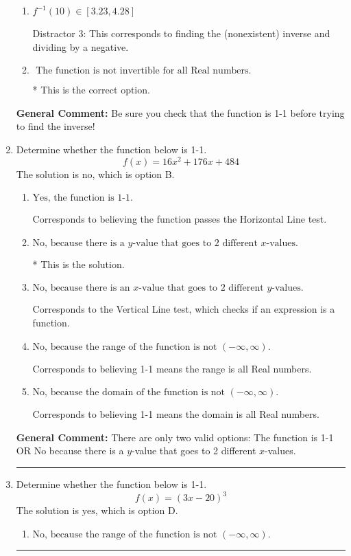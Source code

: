\documentclass{extbook}[14pt]
\newcommand{\litem}[1]{\item #1

\rule{\textwidth}{0.4pt}}
\begin{document}
\begin{enumerate}
{\begin{enumerate}[label=\Alph*.]
 Distractor 2: This corresponds to finding the (nonexistent) inverse and not subtracting by the vertical shift.
\item \( f^{-1}(10) \in [3.23, 4.28] \)

 Distractor 3: This corresponds to finding the (nonexistent) inverse and dividing by a negative.
\item \( \text{ The function is not invertible for all Real numbers. } \)

* This is the correct option.
\end{enumerate}

\textbf{General Comment:} Be sure you check that the function is 1-1 before trying to find the inverse!
}
\litem{
Determine whether the function below is 1-1.
\[ f(x) = 16 x^2 + 176 x + 484 \]
The solution is \( \text{no} \), which is option B.\begin{enumerate}[label=\Alph*.]
\item \( \text{Yes, the function is 1-1.} \)

Corresponds to believing the function passes the Horizontal Line test.
\item \( \text{No, because there is a $y$-value that goes to 2 different $x$-values.} \)

* This is the solution.
\item \( \text{No, because there is an $x$-value that goes to 2 different $y$-values.} \)

Corresponds to the Vertical Line test, which checks if an expression is a function.
\item \( \text{No, because the range of the function is not $(-\infty, \infty)$.} \)

Corresponds to believing 1-1 means the range is all Real numbers.
\item \( \text{No, because the domain of the function is not $(-\infty, \infty)$.} \)

Corresponds to believing 1-1 means the domain is all Real numbers.
\end{enumerate}

\textbf{General Comment:} There are only two valid options: The function is 1-1 OR No because there is a $y$-value that goes to 2 different $x$-values.
}
\litem{
Determine whether the function below is 1-1.
\[ f(x) = (3 x - 20)^3 \]
The solution is \( \text{yes} \), which is option D.\begin{enumerate}[label=\Alph*.]
\item \( \text{No, because the range of the function is not $(-\infty, \infty)$.} \)


\end{enumerate}}
\end{enumerate}
\end{document}
